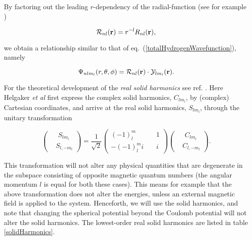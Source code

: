 By factoring out the leading $r$-dependency of the radial-function
(see for example \cite{shankar1994} \newline \newline)

\begin{equation*}
  {\cal R}_{nl}(\mathbf{r}) = r^{-l} R_{nl}(\mathbf{r}),
\end{equation*}

we obtain a relationship similar to that of
eq.~(\ref{totalHydrogenWavefunction}), namely

\begin{equation*}
  \Psi_{nlm_l}(r,\theta, \phi) %
  = {\cal R}_{nl}(\mathbf{r})\cdot{\cal Y}_{lm_l}(\mathbf{r}).
\end{equation*}

For the theoretical development of the \emph{real solid harmonics} see
ref. \cite{helgaker2002}. Here Helgaker \emph{et al} first 
express the complex solid harmonics, $C_{lm_l}$, by (complex) Cartesian
coordinates, and arrive at the real solid harmonics, $S_{lm_l}$, through
the unitary transformation

\begin{equation*}
  \left( \begin{split} &\phantom{i} S_{lm_l} \\ 
    &S_{l,-m_l} \end{split} \right) 
  = \frac{1}{\sqrt{2}} \left(        \begin{split}
    (-1)^m_l \phantom{a} & \phantom{aa} 1 \\ 
    -(-1)^m_l i & \phantom{aa} i       \end{split} \right)  
  \left( \begin{split} &\phantom{i} C_{lm_l} \\ 
    &C_{l,-m_l} \end{split} \right).
\end{equation*}

This transformation will not alter any physical quantities that are
degenerate in the subspace consisting of opposite magnetic quantum
numbers (the angular momentum $l$ is equal for both these cases). This
means for example that the above transformation does not alter the
energies, unless an external magnetic field is applied to the
system. Henceforth, we will use the solid harmonics, and note that
changing the spherical potential beyond the Coulomb potential will not
alter the solid harmonics. The lowest-order real solid harmonics are
listed in table \ref{solidHarmonics}.

